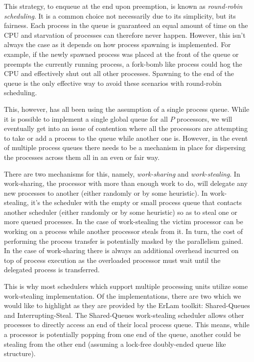 This strategy, to enqueue at the end upon preemption, 
is known as {\em round-robin scheduling}. It is a common choice not
necessarily due to its simplicity, but its fairness. Each process in the queue
is guaranteed an equal amount of time on the CPU and starvation of processes
can therefore never happen. However, this isn't always the case as it depends
on how process spawning is implemented. For example, if the newly spawned
process was placed at the front of the queue or preempts the currently running
process, a fork-bomb like process could hog the CPU and effectively shut out
all other processes. Spawning to the end of the queue is the only effective way
to avoid these scenarios with round-robin scheduling.

This, however, has all been using the assumption of a single process queue. While
it is possible to implement a single global queue for all $P$ processors, we will
eventually get into an issue of contention where all the processors are 
attempting to take or add a process to the queue while another one is. However,
in the event of multiple process queues there needs to be a mechanism in place 
for dispersing the processes across them all in an even or fair way.

There are two mechanisms for this, namely, \emph{work-sharing} and
\emph{work-stealing}. In work-sharing, the processor with more than enough work
to do, will delegate any new processes to another (either randomly or by some
heuristic). In work-stealing, it's the scheduler with the empty or small
process queue that contacts another scheduler (either randomly or by some
heuristic) so as to steal one or more queued processes. In the case of
work-stealing the victim processor can be working on a process while another
processor steals from it. In turn, the cost of performing the process transfer
is potentially masked by the parallelism gained. In the case of work-sharing
there is always an additional overhead incurred on top of process execution as
the overloaded processor must wait until the delegated process is transferred.

This is why most schedulers which support multiple processing units utilize 
some work-stealing implementation. Of the implementations, there are two which 
we would like to highlight as they are provided by the ErLam toolkit: 
Shared-Queues and Interrupting-Steal. The Shared-Queues work-stealing scheduler
allows other processes to directly access an end of their local process queue. 
This means, while a processor is potentially popping from one end of the queue,
another could be stealing from the other end (assuming a lock-free doubly-ended 
queue like structure).

